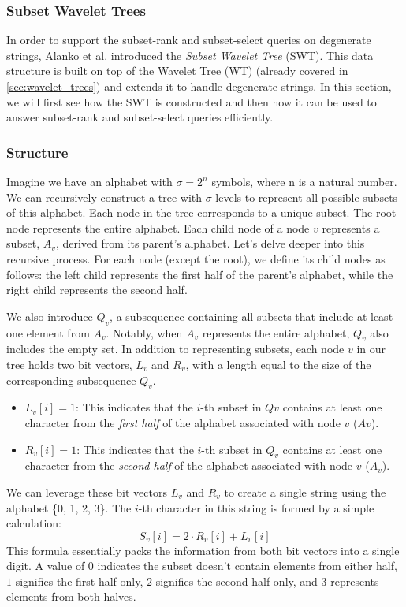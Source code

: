 \subsubsection{Subset Wavelet Trees} \label{sec:subset_wavelet_trees}
In order to support the subset-rank and subset-select queries on degenerate strings, Alanko et al. \cite{SubsetWT} introduced the \emph{Subset Wavelet Tree} (SWT). This data structure is built on top of the Wavelet Tree (WT) \cite{GrossiWT2003} (already covered in \autoref{sec:wavelet_trees}) and extends it to handle degenerate strings. In this section, we will first see how the SWT is constructed and then how it can be used to answer subset-rank and subset-select queries efficiently.

\subsubsection*{Structure} \label{sec:swt_structure}

Imagine we have an alphabet with $\sigma = 2^n$ symbols, where n is a natural number. We can recursively construct a tree with $\sigma$ levels to represent all possible subsets of this alphabet. Each node in the tree corresponds to a unique subset. The root node represents the entire alphabet. Each child node of a node $v$ represents a subset, $A_v$, derived from its parent's alphabet. Let's delve deeper into this recursive process. For each node (except the root), we define its child nodes as follows: the left child represents the first half of the parent's alphabet, while the right child represents the second half. \vspace{0.4cm}

\noindent We also introduce $Q_v$, a subsequence containing all subsets that include at least one element from $A_v$. Notably, when $A_v$ represents the entire alphabet, $Q_v$ also includes the empty set. In addition to representing subsets, each node $v$ in our tree holds two bit vectors, $L_v$ and $R_v$, with a length equal to the size of the corresponding subsequence $Q_v$.
\begin{itemize}
    \item $L_v[i] = 1$: This indicates that the $i$-th subset in $Qv$ contains at least one character from the \emph{first half} of the alphabet associated with node $v$ ($Av$).
    \item $R_v[i] = 1$: This indicates that the $i$-th subset in $Q_v$ contains at least one character from the \emph{second half} of the alphabet associated with node $v$ ($A_v$).
\end{itemize}
We can leverage these bit vectors $L_v$ and $R_v$ to create a single string using the alphabet \{0, 1, 2, 3\}. The $i$-th character in this string is formed by a simple calculation:
\begin{equation}
    S_v[i] = 2 \cdot R_v[i] + L_v[i]
\end{equation}
This formula essentially packs the information from both bit vectors into a single digit. A value of $0$ indicates the subset doesn't contain elements from either half, $1$ signifies the first half only, $2$ signifies the second half only, and $3$ represents elements from both halves. \vspace{0.4cm}

